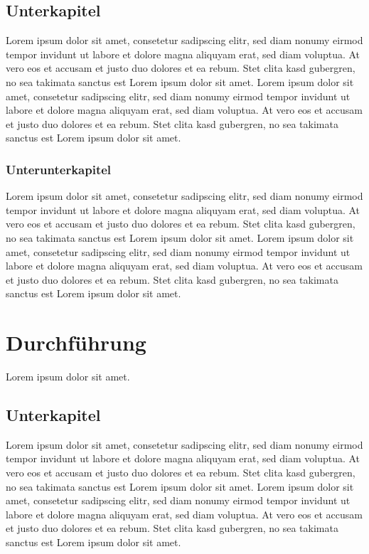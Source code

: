 \documentclass[a4paper,12pt,bibliography=totoc]{scrreprt}
\begin{document}
\section{Unterkapitel}
\label{sec:u1}
Lorem ipsum dolor sit amet, consetetur sadipscing elitr, sed diam nonumy eirmod tempor invidunt ut labore et dolore magna aliquyam erat, sed diam voluptua. At vero eos et accusam et justo duo dolores et ea rebum. Stet clita kasd gubergren, no sea takimata sanctus est Lorem ipsum dolor sit amet. Lorem ipsum dolor sit amet, consetetur sadipscing elitr, sed diam nonumy eirmod tempor invidunt ut labore et dolore magna aliquyam erat, sed diam voluptua. At vero eos et accusam et justo duo dolores et ea rebum. Stet clita kasd gubergren, no sea takimata sanctus est Lorem ipsum dolor sit amet.

\subsection{Unterunterkapitel}
\label{sec:u2}
Lorem ipsum dolor sit amet, consetetur sadipscing elitr, sed diam nonumy eirmod tempor invidunt ut labore et dolore magna aliquyam erat, sed diam voluptua. At vero eos et accusam et justo duo dolores et ea rebum. Stet clita kasd gubergren, no sea takimata sanctus est Lorem ipsum dolor sit amet. Lorem ipsum dolor sit amet, consetetur sadipscing elitr, sed diam nonumy eirmod tempor invidunt ut labore et dolore magna aliquyam erat, sed diam voluptua. At vero eos et accusam et justo duo dolores et ea rebum. Stet clita kasd gubergren, no sea takimata sanctus est Lorem ipsum dolor sit amet.


\chapter{Durchführung}
\label{chap:durchführung}
Lorem ipsum dolor sit amet.

\section{Unterkapitel}
\label{sec:u3}
Lorem ipsum dolor sit amet, consetetur sadipscing elitr, sed diam nonumy eirmod tempor invidunt ut labore et dolore magna aliquyam erat, sed diam voluptua. At vero eos et accusam et justo duo dolores et ea rebum. Stet clita kasd gubergren, no sea takimata sanctus est Lorem ipsum dolor sit amet. Lorem ipsum dolor sit amet, consetetur sadipscing elitr, sed diam nonumy eirmod tempor invidunt ut labore et dolore magna aliquyam erat, sed diam voluptua. At vero eos et accusam et justo duo dolores et ea rebum. Stet clita kasd gubergren, no sea takimata sanctus est Lorem ipsum dolor sit amet.
\end{document}
